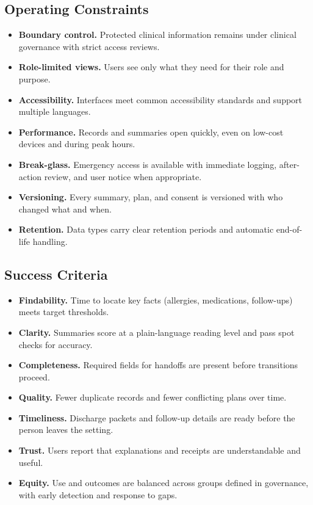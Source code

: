 \documentclass[12pt]{article}
\begin{document}
\subsection*{Operating Constraints}
\begin{itemize}[leftmargin=*]
  \item \textbf{Boundary control.} Protected clinical information remains under clinical governance with strict access reviews.
  \item \textbf{Role-limited views.} Users see only what they need for their role and purpose.
  \item \textbf{Accessibility.} Interfaces meet common accessibility standards and support multiple languages.
  \item \textbf{Performance.} Records and summaries open quickly, even on low-cost devices and during peak hours.
  \item \textbf{Break-glass.} Emergency access is available with immediate logging, after-action review, and user notice when appropriate.
  \item \textbf{Versioning.} Every summary, plan, and consent is versioned with who changed what and when.
  \item \textbf{Retention.} Data types carry clear retention periods and automatic end-of-life handling.
\end{itemize}

\subsection*{Success Criteria}
\begin{itemize}[leftmargin=*]
  \item \textbf{Findability.} Time to locate key facts (allergies, medications, follow-ups) meets target thresholds.
  \item \textbf{Clarity.} Summaries score at a plain-language reading level and pass spot checks for accuracy.
  \item \textbf{Completeness.} Required fields for handoffs are present before transitions proceed.
  \item \textbf{Quality.} Fewer duplicate records and fewer conflicting plans over time.
  \item \textbf{Timeliness.} Discharge packets and follow-up details are ready before the person leaves the setting.
  \item \textbf{Trust.} Users report that explanations and receipts are understandable and useful.
  \item \textbf{Equity.} Use and outcomes are balanced across groups defined in governance, with early detection and response to gaps.
\end{itemize}
\end{document}
